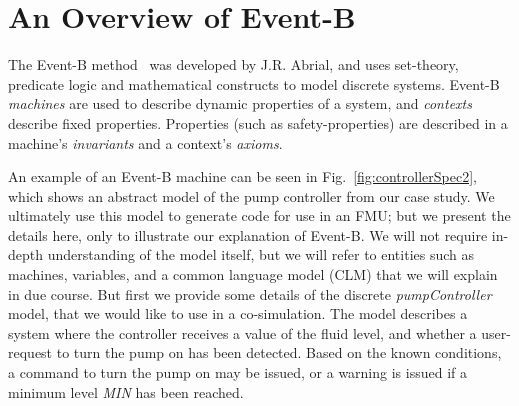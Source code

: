 \documentclass{llncs}%
\begin{document}
\section{An Overview of Event-B}\label{EB}
%
The Event-B method~\cite{ABR10} was developed by J.R. Abrial, and uses set-theory, predicate logic and mathematical constructs to model discrete systems. Event-B \emph{machines} are used to describe dynamic properties of a system, and \emph{contexts} describe fixed properties. Properties (such as safety-properties) are described in a machine's \emph{invariants} and a context's \emph{axioms}. 

An example of an Event-B machine can be seen in Fig.~\ref{fig:controllerSpec2}, which shows an abstract model of the pump controller from our case study. We ultimately use this model to generate code for use in an FMU; but we present the details here, only to illustrate our explanation of Event-B. We will not require in-depth understanding of the model itself, but we will refer to entities such as machines, variables, and a common language model (CLM) that we will explain in due course.  But first we provide some details of the discrete \emph{pumpController} model, that we would like to use in a co-simulation. The model describes a system where the controller receives a value of the fluid level, and whether a user-request to turn the pump on has been detected. Based on the known conditions, a command to turn the pump on may be issued, or a warning is issued if a minimum level \emph{MIN} has been reached.    
%
%
\end{document}
